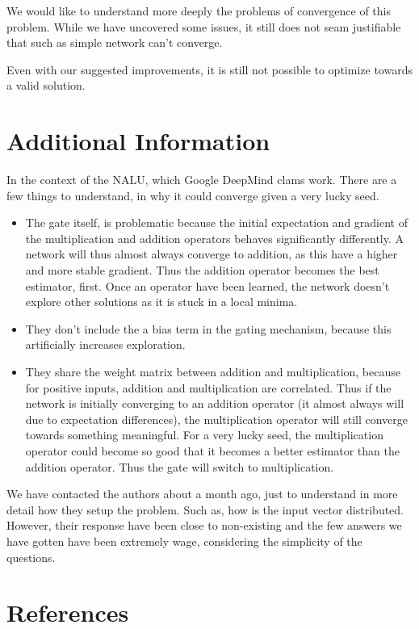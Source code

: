 \documentclass[a4paper]{article}
\begin{document}
We would like to understand more deeply the problems of convergence of this problem. While we have uncovered some issues, it still does not seam justifiable that such as simple network can't converge.

Even with our suggested improvements, it is still not possible to optimize towards a valid solution. 

\section{Additional Information}

In the context of the NALU, which Google DeepMind clams work. There are a few things to understand, in why it could converge given a very lucky seed.

\begin{itemize}
\item The gate itself, is problematic because the initial expectation and gradient of the multiplication and addition operators behaves significantly differently. A network will thus almost always converge to addition, as this have a higher and more stable gradient. Thus the addition operator becomes the best estimator, first. Once an operator have been learned, the network doesn't explore other solutions as it is stuck in a local minima.
\item They don't include the a bias term in the gating mechanism, because this artificially increases exploration.
\item They share the weight matrix between addition and multiplication, because for positive inputs, addition and multiplication are correlated. Thus if the network is initially converging to an addition operator (it almost always will due to expectation differences), the multiplication operator will still converge towards something meaningful. For a very lucky seed, the multiplication operator could become so good that it becomes a better estimator than the addition operator. Thus the gate will switch to multiplication.
\end{itemize}

We have contacted the authors about a month ago, just to understand in more detail how they setup the problem. Such as, how is the input vector distributed. However, their response have been close to non-existing and the few answers we have gotten have been extremely wage, considering the simplicity of the questions.

\section{References}
\printbibliography[heading=none]
\end{document}
